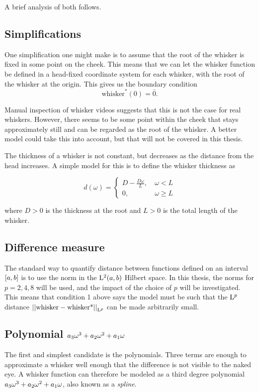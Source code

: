 A brief analysis of both follows.

\subsection{Simplifications}
One simplification one might make is to assume that the root of the
whisker is fixed in some point on the cheek. This means that we can
let the whisker function be defined in a head-fixed coordinate system
for each whisker, with the root of the whisker at the origin. This
gives us the boundary condition
\begin{equation}
    \label{eq:bv_root}
    \text{whisker}^*(0)=\bar{0}.
\end{equation}

Manual inspection of whisker videos suggests that this is not the case
for real whiskers. However, there seems to be some point within the
cheek that stays approximately still and can be regarded as the root
of the whisker. A better model could take this into account, but that
will not be covered in this thesis.

The thickness of a whisker is not constant, but decreases as the
distance from the head increases. A simple model for this is to define
the whisker thickness as

\begin{equation}
    d(\omega) = \begin{cases}
        D-\frac{D\omega}{L},~& \omega<L\\
        0,~& \omega\ge L
    \end{cases}
\end{equation}

where $D>0$ is the thickness at the root and $L>0$ is the total length of the
whisker.

\subsection{Difference measure}
    The standard way to quantify distance between functions defined on an
    interval $\interval{a}{b}$ is to use the norm in the $\Lp[2](a, b)$
    Hilbert space. In this thesis, the norms for $p = 2, 4, 8$ will be
    used, and the impact of the choice of $p$ will be investigated. This
    means that condition 1 above says the model must be such that the
    $\Lp$ distance $\Lpnorm{\text{whisker} - \text{whisker*}}$ can be made
    arbitrarily small.

\subsection{Polynomial $\Spline{\omega}$}
The first and simplest candidate is the polynomials. Three terms are
enough to approximate a whisker well enough that the difference is not
visible to the naked eye. A whisker function can therefore be modeled
as a third degree polynomial $\Spline{\omega}$, also known as a
\emph{spline}.

